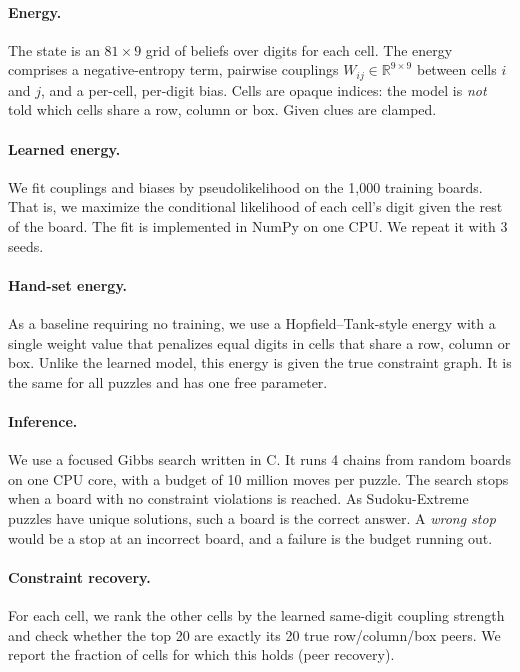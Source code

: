 \documentclass{article} %
\begin{document}
\paragraph{Energy.} The state is an $81\times 9$ grid of beliefs over digits for each cell. The energy comprises a negative-entropy term, pairwise couplings $W_{ij}\in\mathbb{R}^{9\times 9}$ between cells $i$ and $j$, and a per-cell, per-digit bias. Cells are opaque indices: the model is \emph{not} told which cells share a row, column or box. Given clues are clamped.

\paragraph{Learned energy.} We fit couplings and biases by pseudolikelihood \citep{besag1975statistical} on the 1,000 training boards. That is, we maximize the conditional likelihood of each cell's digit given the rest of the board. The fit is implemented in NumPy on one CPU. We repeat it with 3 seeds.

\paragraph{Hand-set energy.} As a baseline requiring no training, we use a Hopfield--Tank-style energy \citep{hopfield1985neural} with a single weight value that penalizes equal digits in cells that share a row, column or box. Unlike the learned model, this energy is given the true constraint graph. It is the same for all puzzles and has one free parameter.

\paragraph{Inference.} We use a focused Gibbs search \citep{geman1984stochastic} written in C. It runs 4 chains from random boards on one CPU core, with a budget of 10 million moves per puzzle. The search stops when a board with no constraint violations is reached. As Sudoku-Extreme puzzles have unique solutions, such a board is the correct answer. A \emph{wrong stop} would be a stop at an incorrect board, and a failure is the budget running out.

\paragraph{Constraint recovery.} For each cell, we rank the other cells by the learned same-digit coupling strength and check whether the top 20 are exactly its 20 true row/column/box peers. We report the fraction of cells for which this holds (peer recovery).
\end{document}
